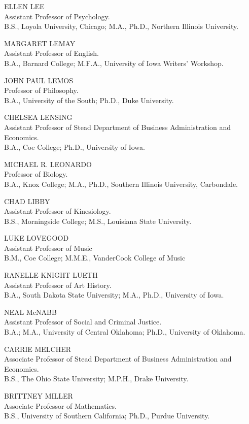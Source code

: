 \documentclass[
  letterpaper,
]{scrbook}
\begin{document}
ELLEN LEE\\
Assistant Professor of Psychology.\\
B.S., Loyola University, Chicago; M.A., Ph.D., Northern Illinois
University.

MARGARET LEMAY\\
Assistant Professor of English.\\
B.A., Barnard College; M.F.A., University of Iowa Writers' Workshop.

JOHN PAUL LEMOS\\
Professor of Philosophy.\\
B.A., University of the South; Ph.D., Duke University.

CHELSEA LENSING\\
Assistant Professor of Stead Department of Business Administration and
Economics.\\
B.A., Coe College; Ph.D., University of Iowa.

MICHAEL R. LEONARDO\\
Professor of Biology.\\
B.A., Knox College; M.A., Ph.D., Southern Illinois University,
Carbondale.

CHAD LIBBY\\
Assistant Professor of Kinesiology.\\
B.S., Morningside College; M.S., Louisiana State University.

LUKE LOVEGOOD\\
Assistant Professor of Music\\
B.M., Coe College; M.M.E., VanderCook College of Music

RANELLE KNIGHT LUETH\\
Assistant Professor of Art History.\\
B.A., South Dakota State University; M.A., Ph.D., University of Iowa.

NEAL McNABB\\
Assistant Professor of Social and Criminal Justice.\\
B.A.; M.A., University of Central Oklahoma; Ph.D., University of
Oklahoma.

CARRIE MELCHER\\
Associate Professor of Stead Department of Business Administration and
Economics.\\
B.S., The Ohio State University; M.P.H., Drake University.

BRITTNEY MILLER\\
Associate Professor of Mathematics.\\
B.S., University of Southern California; Ph.D., Purdue University.
\end{document}
